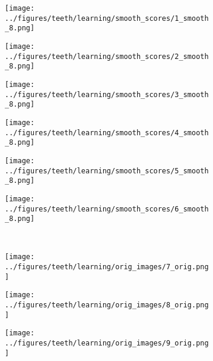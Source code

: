 \begin{figure}[h!]
	\begin{subfigure}{0.15\textwidth}
		\centering
		\texttt{[image: ../figures/teeth/learning/smooth\_scores/1\_smooth\_8.png]}
		\label{fig:1}
	\end{subfigure}
	\begin{subfigure}{0.15\textwidth}
		\centering
		\texttt{[image: ../figures/teeth/learning/smooth\_scores/2\_smooth\_8.png]}
		\label{fig:1}
	\end{subfigure}
	\begin{subfigure}{0.15\textwidth}
		\centering
		\texttt{[image: ../figures/teeth/learning/smooth\_scores/3\_smooth\_8.png]}
		\label{fig:1}
	\end{subfigure}
	\begin{subfigure}{0.15\textwidth}
		\centering
		\texttt{[image: ../figures/teeth/learning/smooth\_scores/4\_smooth\_8.png]}
		\label{fig:1}
	\end{subfigure}
	\begin{subfigure}{0.15\textwidth}
		\centering
		\texttt{[image: ../figures/teeth/learning/smooth\_scores/5\_smooth\_8.png]}
		\label{fig:1}
	\end{subfigure}
	\begin{subfigure}{0.15\textwidth}
		\centering
		\texttt{[image: ../figures/teeth/learning/smooth\_scores/6\_smooth\_8.png]}
		\label{fig:1}
	\end{subfigure}
	\\
	\begin{subfigure}[b]{0.03\textwidth} %
		\centering
	\end{subfigure}
	\begin{subfigure}{0.15\textwidth}
		\centering
		\texttt{[image: ../figures/teeth/learning/orig\_images/7\_orig.png]}
		\label{fig:1}
	\end{subfigure}
	\begin{subfigure}{0.15\textwidth}
		\centering
		\texttt{[image: ../figures/teeth/learning/orig\_images/8\_orig.png]}
		\label{fig:1}
	\end{subfigure}
	\begin{subfigure}{0.15\textwidth}
		\centering
		\texttt{[image: ../figures/teeth/learning/orig\_images/9\_orig.png]}
		\label{fig:1}
	\end{subfigure}

\end{figure}
